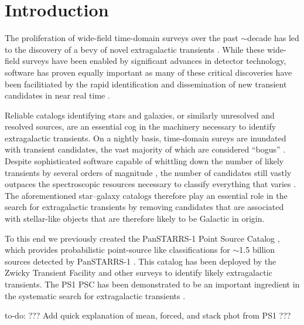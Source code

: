 \documentclass[twocolumn]{aastex63}
\newcommand{\todo}[1]{{\color{magenta} to-do: {#1}}}
\begin{document}
\section{Introduction} \label{sec:intro}

The proliferation of wide-field time-domain surveys over the past $\sim$decade
has led to the discovery of a bevy of novel extragalactic transients
\citep[e.g.,][]{quimby11,Gezari12,Gal-Yam14,Abbott17a,Prentice18,
IceCube-Collaboration18}. While these wide-field surveys have been enabled by
significant advances in detector technology, software has proven equally
important \citep[e.g.,][]{Masci17,Masci19,Smith20,Jones20} as many of these
critical discoveries have been facilitiated by the rapid identification and
dissemination of new transient candidates in near real time
\citep[e.g.,][]{Patterson19}.

Reliable catalogs identifying stars and galaxies, or similarly unresolved and
resolved sources, are an essential cog in the machinery necessary to identify
extragalactic transients. On a nightly basis, time-domain sureys are inundated
with transient candidates, the vast majority of which are considered ``bogus''
\citep{Bloom12}. Despite sophisticated software capable of whittling down the
number of likely transients by several orders of magnitude
\citep[e.g.,][]{Brink13,Goldstein15,Duev19,Smith20}, the number of candidates
still vastly outpaces the spectroscopic resources necessary to classify
everything that varies \citep[e.g.,][]{Kulkarni20}. The aforementioned
star--galaxy catalogs therefore play an essential role in the search for
extragalactic transients by removing candidates that are associated with
stellar-like objects that are therefore likely to be Galactic in origin.

To this end we previously created the PanSTARRS-1 Point Source Catalog
\citep[PS1 PSC; Tachibana \& Miller 2018, hereafter ][]{Tachibana18}, which
provides probabilistic point-source like classifications for $\sim$1.5 billion
sources detected by PanSTARRS-1 \citep[PS1;][]{Chambers16}. This catalog has
been deployed by the Zwicky Transient Facility \citep[ZTF;][]{Bellm19} and
other surveys \citep{Smith20,Moller20} to identify likely extragalactic
transients. The PS1 PSC has been demonstrated to be an important ingredient in
the systematic search for extragalactic transients \citep{Fremling20,De20}.

\todo{??? Add quick explanation of mean, forced, and stack phot from PS1 ???}
\end{document}
